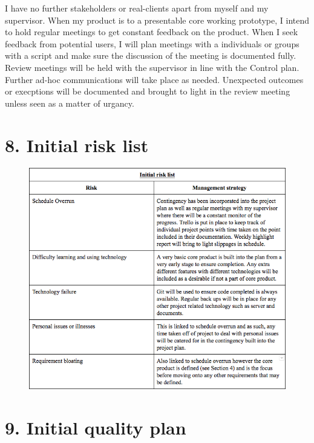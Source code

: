 \documentclass[a4paper]{article}
\begin{document}
I have no further stakeholders or real-clients apart from myself and my supervisor. When my product is to a presentable core working prototype, I intend to hold regular meetings to get constant feedback on the product. When I seek feedback from potential users, I will plan meetings with a individuals or groups with a script and make sure the discussion of the meeting is documented fully. Review meetings will be held with the supervisor in line with the Control plan. Further ad-hoc communications will take place as needed. Unexpected outcomes or execptions will be documented and brought to light in the review meeting unless seen as a matter of urgancy.

\section{8. Initial risk list}

\begin{figure}

    \includegraphics[width=\linewidth]{../../img/initial-risk-table.png}

\end{figure}

\section{9. Initial quality plan}
\end{document}
